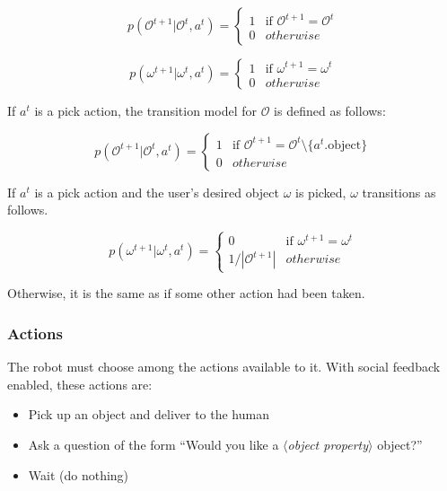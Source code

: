 \documentclass[letterpaper]{article}
\begin{document}
\begin{equation}
	p(\mathcal{O}^{t+1}|\mathcal{O}^{t}, a^t) = 
\begin{cases} 
	1 & \text{if } \mathcal{O}^{t+1} = \mathcal{O}^t \\
  0 & otherwise
\end{cases}
\end{equation}

\begin{equation}
	p(\omega^{t+1}|\omega^{t}, a^t) = 
\begin{cases} 
	1 & \text{if } \omega^{t+1} = \omega^t \\
  0 & otherwise
\end{cases}
\end{equation}

If $a^t$ is a pick action, the transition model for $\mathcal{O}$ is defined as follows: 

\begin{equation}
	p(\mathcal{O}^{t+1}|\mathcal{O}^{t}, a^t) = 
\begin{cases} 
	1 & \text{if } \mathcal{O}^{t+1} = \mathcal{O}^t \setminus \{a^t.\text{object}\} \\
  0 & otherwise
\end{cases}
\end{equation}

If $a^t$ is a pick action and the user's desired object $\omega$ is picked, $\omega$ transitions as follows. 

\begin{equation}
	p(\omega^{t+1}|\omega^{t}, a^t) = 
\begin{cases} 
	0 & \text{if } \omega^{t+1} = \omega^t \\
	1/|\mathcal{O}^{t+1}|	& otherwise
\end{cases}
\end{equation}

Otherwise, it is the same as if some other action had been taken.


\subsubsection{Actions}

The robot must choose among the actions available to it. With social feedback enabled, these actions are: 
\begin{itemize}
	\item Pick up an object and deliver to the human
  \item Ask a question of the form ``Would you like a \emph{$\langle$object property$\rangle$} object?''
  \item Wait (do nothing)
\end{itemize}
\end{document}
